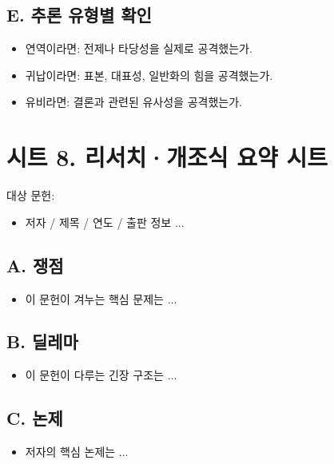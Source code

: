 \subsection{E. 추론 유형별 확인}\label{e-uxcd94uxb860-uxc720uxd615uxbcc4-uxd655uxc778}

\begin{itemize}
\tightlist
\item
  연역이라면: 전제나 타당성을 실제로 공격했는가.
\item
  귀납이라면: 표본, 대표성, 일반화의 힘을 공격했는가.
\item
  유비라면: 결론과 관련된 유사성을 공격했는가.
\end{itemize}

\section{시트 8. 리서치·개조식 요약 시트}\label{uxc2dcuxd2b8-8-uxb9acuxc11cuxce58uxac1cuxc870uxc2dd-uxc694uxc57d-uxc2dcuxd2b8}

대상 문헌:

\begin{itemize}
\tightlist
\item
  저자 / 제목 / 연도 / 출판 정보 ...
\end{itemize}

\subsection{A. 쟁점}\label{a-uxc7c1uxc810}

\begin{itemize}
\tightlist
\item
  이 문헌이 겨누는 핵심 문제는 ...
\end{itemize}

\subsection{B. 딜레마}\label{b-uxb51cuxb808uxb9c8}

\begin{itemize}
\tightlist
\item
  이 문헌이 다루는 긴장 구조는 ...
\end{itemize}

\subsection{C. 논제}\label{c-uxb17cuxc81c}

\begin{itemize}
\tightlist
\item
  저자의 핵심 논제는 ...
\end{itemize}

